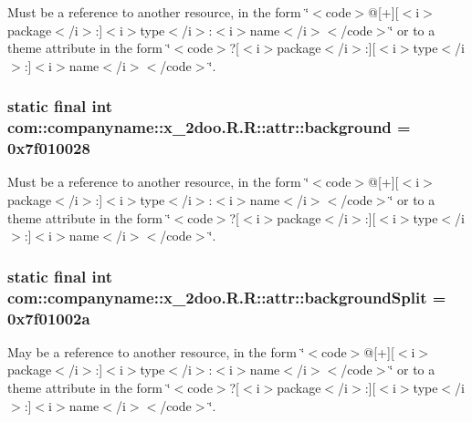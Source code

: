 Must be a reference to another resource, in the form \char`\"{}$<$code$>$@\mbox{[}+\mbox{]}\mbox{[}$<$i$>$package$<$/i$>$:\mbox{]}$<$i$>$type$<$/i$>$:$<$i$>$name$<$/i$>$$<$/code$>$\char`\"{} or to a theme attribute in the form \char`\"{}$<$code$>$?\mbox{[}$<$i$>$package$<$/i$>$:\mbox{]}\mbox{[}$<$i$>$type$<$/i$>$:\mbox{]}$<$i$>$name$<$/i$>$$<$/code$>$\char`\"{}. \hypertarget{classcom_1_1companyname_1_1x__2doo_1_1_r_1_1attr_fc97d2bd51d655faed306bf08124fc83}{
\subsubsection[{background}]{\setlength{\rightskip}{0pt plus 5cm}static final int com::companyname::x\_\-2doo.R.R::attr::background = 0x7f010028}}
\label{classcom_1_1companyname_1_1x__2doo_1_1_r_1_1attr_fc97d2bd51d655faed306bf08124fc83}


Must be a reference to another resource, in the form \char`\"{}$<$code$>$@\mbox{[}+\mbox{]}\mbox{[}$<$i$>$package$<$/i$>$:\mbox{]}$<$i$>$type$<$/i$>$:$<$i$>$name$<$/i$>$$<$/code$>$\char`\"{} or to a theme attribute in the form \char`\"{}$<$code$>$?\mbox{[}$<$i$>$package$<$/i$>$:\mbox{]}\mbox{[}$<$i$>$type$<$/i$>$:\mbox{]}$<$i$>$name$<$/i$>$$<$/code$>$\char`\"{}. \hypertarget{classcom_1_1companyname_1_1x__2doo_1_1_r_1_1attr_8fda96db8ccf56c969203da5517b488e}{
\subsubsection[{backgroundSplit}]{\setlength{\rightskip}{0pt plus 5cm}static final int com::companyname::x\_\-2doo.R.R::attr::backgroundSplit = 0x7f01002a}}
\label{classcom_1_1companyname_1_1x__2doo_1_1_r_1_1attr_8fda96db8ccf56c969203da5517b488e}


May be a reference to another resource, in the form \char`\"{}$<$code$>$@\mbox{[}+\mbox{]}\mbox{[}$<$i$>$package$<$/i$>$:\mbox{]}$<$i$>$type$<$/i$>$:$<$i$>$name$<$/i$>$$<$/code$>$\char`\"{} or to a theme attribute in the form \char`\"{}$<$code$>$?\mbox{[}$<$i$>$package$<$/i$>$:\mbox{]}\mbox{[}$<$i$>$type$<$/i$>$:\mbox{]}$<$i$>$name$<$/i$>$$<$/code$>$\char`\"{}. 

